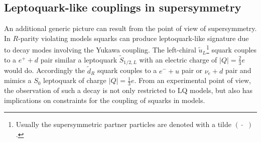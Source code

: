 \subsection{Leptoquark-like couplings in supersymmetry}
An additional generic picture can result from the point of view of supersymmetry. In $R$-parity violating {\SUSY} models squarks can produce leptoquark-like signature due to decay modes involving the Yukawa coupling. The left-chiral $\tilde{u}_L$\footnote{Usually the supersymmetric partner particles are denoted with a tilde $\left(\widetilde{\quad}\right)$.} squark couples to a $e^++d$ pair similar a leptoquark $\tilde{S}_{1/2,L}$ with an electric charge of $|Q|=\frac23 e$ would do. Accordingly the $\tilde{d}_R$ squark couples to a $e^-+u$ pair or $\nu_e+d$ pair and mimics a $S_0$ leptoquark of charge $|Q|=\frac13 e$. From an experimental point of view, the observation of such a decay is not only restricted to LQ models, but also has implications on constraints for the coupling of squarks in {\SUSY} models. \cite{Kuze}     
%
%
